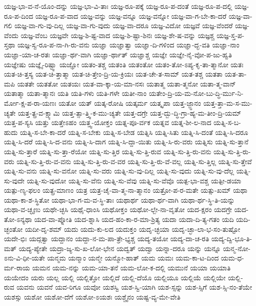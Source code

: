 {ಯಜ್ಞ-ಭಾ-ವ-ನೆ-ಯೊಂ-ದನ್ನು
ಯಜ್ಞ-ಭಾ-ವಿ-ತಾಃ
ಯಜ್ಞ-ರೂ-ಪಕ್ಕೆ
ಯಜ್ಞ-ರೂ-ಪ-ದಂತೆ
ಯಜ್ಞ-ರೂ-ಪ-ದಲ್ಲಿ
ಯಜ್ಞ-ರೂ-ಪ-ದಿಂದ
ಯಜ್ಞ-ರೂ-ಪ-ವಾದ
ಯಜ್ಞ-ವನ್ನು
ಯಜ್ಞ-ವನ್ನೂ
ಯಜ್ಞ-ವನ್ನೋ
ಯಜ್ಞ-ವಾ-ಗ-ಬೇ-ಕಾ-ದರೆ
ಯಜ್ಞ-ವಾ-ಗಲಿ
ಯಜ್ಞ-ವಾ-ಗು-ವು-ದಿಲ್ಲ
ಯಜ್ಞ-ವಾ-ಗು-ವುದು
ಯಜ್ಞ-ವಾ-ದರೂ
ಯಜ್ಞ-ವಿದೋ
ಯಜ್ಞವೆ
ಯಜ್ಞ-ವೆಂದರೆ
ಯಜ್ಞ-ವೆಂದು
ಯಜ್ಞ-ವೆಂಬ
ಯಜ್ಞವೇ
ಯಜ್ಞ-ಶಿ-ಷ್ಟ-ವಾದ
ಯಜ್ಞ-ಶಿ-ಷ್ಟಾ-ಶಿನಃ
ಯಜ್ಞ-ಶೇ-ಷ-ವನ್ನು
ಯಜ್ಞಶ್ಚ
ಯಜ್ಞ-ಸ್ತ-ಪ-ಸ್ತಥಾ
ಯಜ್ಞ-ಸ್ವ-ರೂ-ಪ-ನಾ-ಗಿ-ರು-ವನು
ಯಜ್ಞಾ
ಯಜ್ಞಾತ್ವಾ
ಯಜ್ಞಾ-ದಿ-ಗಳಿಂದ
ಯಜ್ಞಾ-ದ್ಭ-ವತಿ
ಯಜ್ಞಾ-ನಾಂ
ಯಜ್ಞಾ-ಯಾ-ಚ-ರತಃ
ಯಜ್ಞಾ-ರ್ಥ-ವಾಗಿ
ಯಜ್ಞಾ-ರ್ಥಾತ್
ಯಜ್ಞಾಶ್ಚ
ಯಜ್ಞೇ
ಯಜ್ಞೇ-ನೈ-ವೋ-ಪ-ಜು-ಹ್ವತಿ
ಯಜ್ಞೇಷು
ಯಜ್ಞೈ-ರಿಷ್ಟ್ವಾ
ಯಜ್ಞೋ
ಯತಂ-ತಶ್ಚ
ಯತಂತಿ
ಯತಂತೋ
ಯತಂ-ತೋ-ಽಪ್ಯ-ಕೃ-ತಾ-ತ್ಮಾನೋ
ಯತಃ
ಯತ-ಚಿ-ತ್ತಸ್ಯ
ಯತ-ಚಿ-ತ್ತಾತ್ಮಾ
ಯತ-ಚಿ-ತ್ತೇಂ-ದ್ರಿ-ಯ-ಕ್ರಿಯಃ
ಯತ-ಚೇ-ತ-ಸಾಮ್
ಯತ-ತಶ್ಚ
ಯತತಾ
ಯತ-ತಾ-ಮಪಿ
ಯತತೇ
ಯತತೋ
ಯತಯಃ
ಯತ-ವಾ-ಕ್ಕಾ-ಯ-ಮಾ-ನಸಃ
ಯತಾತ್ಮ
ಯತಾ-ತ್ಮನೋ
ಯತಾ-ತ್ಮ-ವಾನ್
ಯತಾತ್ಮಾ
ಯತಾ-ತ್ಮಾನಃ
ಯತಿ
ಯತಿ-ಗಳು
ಯತಿ-ಗಳೇ
ಯತೀ-ನಾಂ
ಯತೇಂ-ದ್ರಿ-ಯ-ಮ-ನೋ-ಬು-ದ್ಧಿ-ರ್ಮು-ನಿ-ರ್ಮೋ-ಕ್ಷ-ಪ-ರಾ-ಯಣಃ
ಯತೋ
ಯತ್
ಯತ್ಕ-ರೋಷಿ
ಯತ್ಕರ್ಮ
ಯತ್ಕೃಪಾ
ಯತ್ತ-ಜ್ಜ್ಞಾನಂ
ಯತ್ತ-ತ್ತಾ-ಮ-ಸ-ಮು-ಚ್ಯತೇ
ಯತ್ತ-ತ್ಪ್ರ-ವ-ಕ್ಷ್ಯಾಮಿ
ಯತ್ತ-ತ್ಸಾ-ತ್ತ್ವಿ-ಕ-ಮು-ಚ್ಯತೇ
ಯತ್ತ-ದಗ್ರೇ
ಯತ್ತ-ದ್ಬು-ದ್ಧಿ-ಗ್ರಾ-ಹ್ಯ-ಮ-ತೀಂ-ದ್ರಿ-ಯಮ್
ಯತ್ತ-ಪ-ಸ್ಯಸಿ
ಯತ್ತು
ಯತ್ತೇಽಹಂ
ಯತ್ತ್ವ-ಯೋಕ್ತಂ
ಯತ್ನ-ಪೂ-ರ್ವಕ
ಯತ್ನವ
ಯತ್ನ-ಶೀ-ಲ-ನಾದ
ಯತ್ನಿ-ಸ-ಬ-ಹುದು
ಯತ್ನಿ-ಸ-ಬೇ-ಕಾ-ದರೆ
ಯತ್ನಿ-ಸ-ಬೇಕು
ಯತ್ನಿ-ಸ-ಬೇಡ
ಯತ್ನಿಸಿ
ಯತ್ನಿ-ಸಿತು
ಯತ್ನಿ-ಸಿ-ದಂತೆ
ಯತ್ನಿ-ಸಿ-ದರೂ
ಯತ್ನಿ-ಸಿ-ದರೆ
ಯತ್ನಿ-ಸಿ-ದ-ವನು
ಯತ್ನಿ-ಸಿ-ದಾಗ
ಯತ್ನಿ-ಸಿ-ದ್ದಾ-ಯಿತು
ಯತ್ನಿ-ಸಿ-ರು-ವರು
ಯತ್ನಿಸು
ಯತ್ನಿ-ಸು-ತ್ತಾನೆ
ಯತ್ನಿ-ಸು-ತ್ತಾರೆ
ಯತ್ನಿ-ಸು-ತ್ತಾ-ರೆಯೋ
ಯತ್ನಿ-ಸು-ತ್ತಿರ
ಯತ್ನಿ-ಸು-ತ್ತಿ-ರುವ
ಯತ್ನಿ-ಸು-ತ್ತಿ-ರು-ವನು
ಯತ್ನಿ-ಸು-ತ್ತಿ-ರು-ವರು
ಯತ್ನಿ-ಸು-ತ್ತಿ-ರು-ವ-ವನು
ಯತ್ನಿ-ಸು-ತ್ತಿ-ರು-ವ-ವರ
ಯತ್ನಿ-ಸು-ತ್ತಿ-ರು-ವೆ-ವಲ್ಲ
ಯತ್ನಿ-ಸು-ತ್ತಿಲ್ಲ
ಯತ್ನಿ-ಸು-ತ್ತೇವೆ
ಯತ್ನಿ-ಸು-ವನು
ಯತ್ನಿ-ಸು-ವನೋ
ಯತ್ನಿ-ಸು-ವರು
ಯತ್ನಿ-ಸು-ವು-ದಿಲ್ಲ
ಯತ್ನಿ-ಸು-ವುದು
ಯತ್ನಿ-ಸು-ವು-ದೆಲ್ಲ
ಯತ್ನಿ-ಸು-ವುದೇ
ಯತ್ನಿ-ಸು-ವುದೋ
ಯತ್ನಿ-ಸು-ವೆನು
ಯತ್ನಿ-ಸು-ವೆವು
ಯತ್ನಿ-ಸು-ವೆವೊ
ಯತ್ಪ-ಭಾ-ವಶ್ಚ
ಯತ್ಪೀ-ಡಯಾ
ಯತ್ಪು-ಣ್ಯ-ಫಲಂ
ಯತ್ಪ್ರ-ಮಾಣಂ
ಯತ್ರ
ಯತ್ರ-ಚೈ-ವಾ-ತ್ಮ-ನಾ-ತ್ಮಾನಂ
ಯತ್ರೋ-ಪ-ರ-ಮತೇ
ಯತ್ಸು-ಖಮ್
ಯಥಾ
ಯಥಾ-ಕಾ-ಶ-ಸ್ಥಿತೋ
ಯಥಾ-ಭಾ-ಗ-ಮ-ವ-ಸ್ಥಿ-ತಾಃ
ಯಥಾರ್ಥ
ಯಥಾ-ರ್ಥ-ವಾಗಿ
ಯಥಾ-ರ್ಥ-ಸ್ಥಿ-ತಿ-ಯನ್ನು
ಯಥಾ-ವ-ಚ್ಛೃಣು
ಯಥೇ-ಚ್ಛಸಿ
ಯಥೈ-ಧಾಂಸಿ
ಯಥೋಕ್ತಂ
ಯಥೋ-ಲ್ಬೇ-ನಾ-ವೃತೋ
ಯದ-ಕ್ಷರಂ
ಯದಗ್ರೇ
ಯದ-ತೋ-ಽನ್ಯಥಾ
ಯದ-ವಾ-ಪ್ನೋತಿ
ಯದ-ಶ್ನಾಸಿ
ಯದ-ಹಂ-ಕಾ-ರ-ಮಾ-ಶ್ರಿತ್ಯ
ಯದಾ
ಯದಾ-ದಿ-ತ್ಯ-ಗತಂ
ಯದಿ
ಯದಿ-ಚ್ಛಂತೋ
ಯದೀ-ದೃ-ಶಮ್
ಯದು
ಯದು-ಕು-ಲದ
ಯದುಕ್ತಂ
ಯದೃ-ಚ್ಛಯಾ
ಯದೃ-ಚ್ಛಾ-ಲಾ-ಭ-ಸಂ-ತುಷ್ಟೋ
ಯದೇ-ಭಿಃ
ಯದ್ಗತ್ವಾ
ಯದ್ದಾನಂ
ಯದ್ದಾ-ನ-ಮ-ಪಾ-ತ್ರೇ-ಭ್ಯಶ್ಚ
ಯದ್ಯ-ತಯೋ
ಯದ್ಯ-ದಾ-ಚ-ರತಿ
ಯದ್ಯ-ದ್ವಿ-ಭೂ-ತಿ-ಮತ್
ಯದ್ಯ-ಪ್ಯೇತೇ
ಯದ್ರಾ-ಜ್ಯ-ಸು-ಖ-ಲೋ-ಭೇನ
ಯದ್ವತ್
ಯದ್ವಾ
ಯನ್ನಾ-ದರೂ
ಯನ್ನು
ಯನ್ನೂ
ಯನ್ಮ-ನೋ-ಽನು-ವಿ-ಧೀ-ಯತೇ
ಯನ್ಮಮ
ಯನ್ಮಾಂ
ಯನ್ಮೇ
ಯನ್ಮೋ-ಹಾತ್
ಯಮ
ಯಮಃ
ಯಮ-ಕಾ-ಟ-ದಿಂದ
ಯಮ-ಧ-ರ್ಮ-ರಾಯ
ಯಮನ
ಯಮ-ನನ್ನು
ಯಮ-ಯಾ-ತನೆ
ಯಮ-ಲೋ-ಕ-ದಲ್ಲಿ
ಯಮುನೆ
ಯಯಾ
ಯಯಾತಿ
ಯಯೇದಂ
ಯರು
ಯಲ್ಲ
ಯಲ್ಲಿ
ಯಲ್ಲಿತ್ತೋ
ಯಲ್ಲಿದೆ
ಯಲ್ಲಿ-ದೆಯೊ
ಯಲ್ಲಿಯೂ
ಯಲ್ಲಿಯೆ
ಯಲ್ಲಿಯೇ
ಯಲ್ಲಿ-ರುವ
ಯವನು
ಯವನೆ
ಯವ-ರಿಗೂ
ಯವೋ
ಯಶಸ್ವಿ
ಯಶ-ಸ್ವಿ-ಯಾಗಿ
ಯಶ-ಸ್ಸನ್ನು
ಯಶ-ಸ್ಸಿಗೆ
ಯಶ-ಸ್ಸಿ-ನಂ-ತೆಯೇ
ಯಶಸ್ಸು
ಯಶೋ
ಯಶೋ-ದೆಗೆ
ಯಶೋ-ಽಯಶಃ
ಯಶ್ಚೈನಂ
ಯಷ್ಟ-ವ್ಯ-ಮೇ-ವೇತಿ
}
